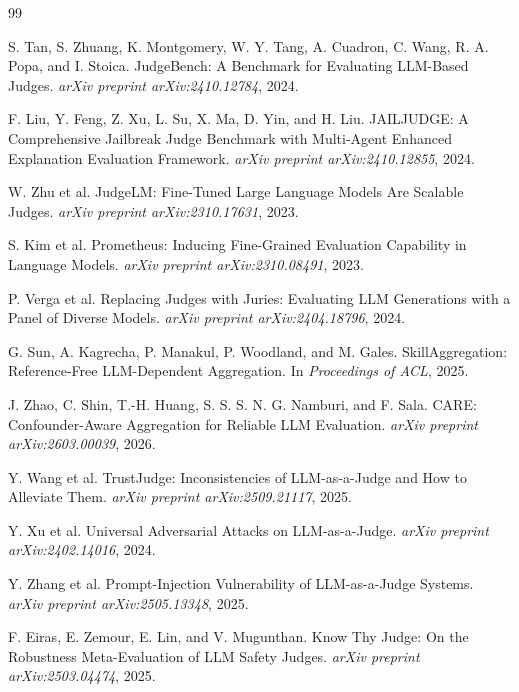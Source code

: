 \documentclass[11pt]{article}
\begin{document}
\begin{thebibliography}{99}

S. Tan, S. Zhuang, K. Montgomery, W. Y. Tang, A. Cuadron, C. Wang, R. A. Popa, and I. Stoica.
\newblock JudgeBench: A Benchmark for Evaluating LLM-Based Judges.
\newblock \emph{arXiv preprint arXiv:2410.12784}, 2024.

F. Liu, Y. Feng, Z. Xu, L. Su, X. Ma, D. Yin, and H. Liu.
\newblock JAILJUDGE: A Comprehensive Jailbreak Judge Benchmark with Multi-Agent Enhanced Explanation Evaluation Framework.
\newblock \emph{arXiv preprint arXiv:2410.12855}, 2024.

W. Zhu et al.
\newblock JudgeLM: Fine-Tuned Large Language Models Are Scalable Judges.
\newblock \emph{arXiv preprint arXiv:2310.17631}, 2023.

S. Kim et al.
\newblock Prometheus: Inducing Fine-Grained Evaluation Capability in Language Models.
\newblock \emph{arXiv preprint arXiv:2310.08491}, 2023.

P. Verga et al.
\newblock Replacing Judges with Juries: Evaluating LLM Generations with a Panel of Diverse Models.
\newblock \emph{arXiv preprint arXiv:2404.18796}, 2024.

G. Sun, A. Kagrecha, P. Manakul, P. Woodland, and M. Gales.
\newblock SkillAggregation: Reference-Free LLM-Dependent Aggregation.
\newblock In \emph{Proceedings of ACL}, 2025.

J. Zhao, C. Shin, T.-H. Huang, S. S. S. N. G. Namburi, and F. Sala.
\newblock CARE: Confounder-Aware Aggregation for Reliable LLM Evaluation.
\newblock \emph{arXiv preprint arXiv:2603.00039}, 2026.

Y. Wang et al.
\newblock TrustJudge: Inconsistencies of LLM-as-a-Judge and How to Alleviate Them.
\newblock \emph{arXiv preprint arXiv:2509.21117}, 2025.

Y. Xu et al.
\newblock Universal Adversarial Attacks on LLM-as-a-Judge.
\newblock \emph{arXiv preprint arXiv:2402.14016}, 2024.

Y. Zhang et al.
\newblock Prompt-Injection Vulnerability of LLM-as-a-Judge Systems.
\newblock \emph{arXiv preprint arXiv:2505.13348}, 2025.

F. Eiras, E. Zemour, E. Lin, and V. Mugunthan.
\newblock Know Thy Judge: On the Robustness Meta-Evaluation of LLM Safety Judges.
\newblock \emph{arXiv preprint arXiv:2503.04474}, 2025.


\end{thebibliography}
\end{document}
